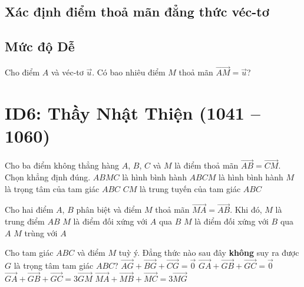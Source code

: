 \subsection{Xác định điểm thoả mãn đẳng thức véc-tơ}
\subsection*{Mức độ Dễ}
\begin{ex}%
	Cho điểm $A$ và véc-tơ $\vec{u}$. Có bao nhiêu điểm $M$ thoả mãn $\vec{AM}=\vec{u}$?
\end{ex}


\section*{ID6: Thầy Nhật Thiện (1041 -- 1060)}
\begin{ex}%
	Cho ba điểm không thẳng hàng $A$, $B$, $C$ và $M$ là điểm thoả mãn $\vec{AB}=\vec{CM}$. Chọn khẳng định đúng.
	\choice
	{\True $ABMC$ là hình bình hành}
	{$ABCM$ là hình bình hành}
	{$M$ là trọng tâm của tam giác $ABC$}
	{$CM$ là trung tuyến của tam giác $ABC$}
\end{ex}

\begin{ex}%
	Cho hai điểm $A$, $B$ phân biệt và điểm $M$ thoả mãn $\vec{MA}=\vec{AB}$. Khi đó,
	\choice
	{$M$ là trung điểm $AB$}
	{$M$ là điểm đối xứng với $A$ qua $B$}
	{\True $M$ là điểm đối xứng với $B$ qua $A$}
	{$M$ trùng với $A$}
\end{ex}

\begin{ex}%
	Cho tam giác $ABC$ và điểm $M$ tuỳ ý. Đẳng thức nào sau đây \textbf{không} suy ra được $G$ là trọng tâm tam giác $ABC$?
	\choice
	{$\vec{AG}+\vec{BG}+\vec{CG}=\vec{0}$}
	{$\vec{GA}+\vec{GB}+\vec{GC}=\vec{0}$}
	{\True $\vec{GA}+\vec{GB}+\vec{GC}=3\vec{GM}$}
	{$\vec{MA}+\vec{MB}+\vec{MC}=3\vec{MG}$}
\end{ex}

